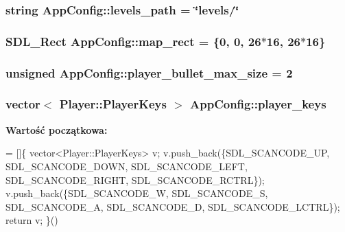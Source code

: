 \subsubsection[{levels\+\_\+path}]{\setlength{\rightskip}{0pt plus 5cm}string App\+Config\+::levels\+\_\+path = \char`\"{}levels/\char`\"{}\hspace{0.3cm}{\ttfamily [static]}}\label{class_app_config_a381fc79705578228b73a1d182f6264f0}
\hypertarget{class_app_config_ae2ae8d61b42619876e21e008cdabc7e0}{}
\subsubsection[{map\+\_\+rect}]{\setlength{\rightskip}{0pt plus 5cm}S\+D\+L\+\_\+\+Rect App\+Config\+::map\+\_\+rect = \{0, 0, 26$\ast$16, 26$\ast$16\}\hspace{0.3cm}{\ttfamily [static]}}\label{class_app_config_ae2ae8d61b42619876e21e008cdabc7e0}
\hypertarget{class_app_config_a31d367b3754781a3559b38da0c6e5a43}{}
\subsubsection[{player\+\_\+bullet\+\_\+max\+\_\+size}]{\setlength{\rightskip}{0pt plus 5cm}unsigned App\+Config\+::player\+\_\+bullet\+\_\+max\+\_\+size = 2\hspace{0.3cm}{\ttfamily [static]}}\label{class_app_config_a31d367b3754781a3559b38da0c6e5a43}
\hypertarget{class_app_config_a8e37a09b8c71975463adcb2c20772021}{}
\subsubsection[{player\+\_\+keys}]{\setlength{\rightskip}{0pt plus 5cm}vector$<$ {\bf Player\+::\+Player\+Keys} $>$ App\+Config\+::player\+\_\+keys\hspace{0.3cm}{\ttfamily [static]}}\label{class_app_config_a8e37a09b8c71975463adcb2c20772021}
{\bfseries Wartość początkowa\+:}
\begin{DoxyCode}
=
[]\{
    vector<Player::PlayerKeys> v;
    v.push\_back(\{SDL\_SCANCODE\_UP, SDL\_SCANCODE\_DOWN, SDL\_SCANCODE\_LEFT, SDL\_SCANCODE\_RIGHT, 
      SDL\_SCANCODE\_RCTRL\});
    v.push\_back(\{SDL\_SCANCODE\_W, SDL\_SCANCODE\_S, SDL\_SCANCODE\_A, SDL\_SCANCODE\_D, SDL\_SCANCODE\_LCTRL\});
    \textcolor{keywordflow}{return} v;
\}()
\end{DoxyCode}
\hypertarget{class_app_config_a623d06a5d3749f2f4177b9017b54fd9d}{}
